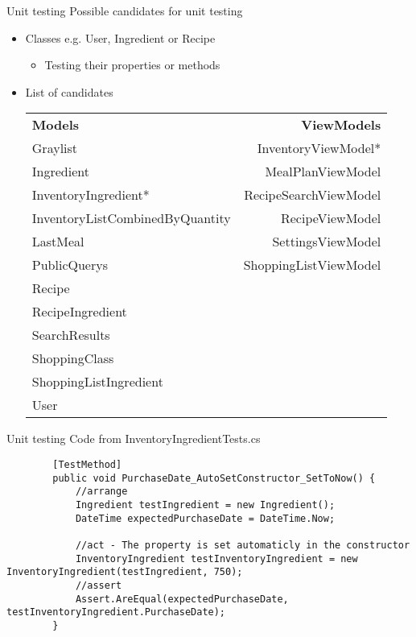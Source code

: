 \begin{frame}[fragile] {Unit testing} {Possible candidates for unit testing}

	\begin{itemize}
		\item Classes e.g. User, Ingredient or Recipe
			\begin{itemize}
				\item Testing their properties or methods
			\end{itemize}
		\item List of candidates	 	
				{\small
				\begin{tabular} {l r}
							\textbf{Models} & \textbf{ViewModels} \\
							Graylist & InventoryViewModel* \\
							Ingredient & MealPlanViewModel \\
							InventoryIngredient* & RecipeSearchViewModel \\
							InventoryListCombinedByQuantity & RecipeViewModel \\
							LastMeal & SettingsViewModel \\
							PublicQuerys & ShoppingListViewModel \\
							Recipe \\
							RecipeIngredient \\
							SearchResults \\
							ShoppingClass \\
							ShoppingListIngredient \\
							User
				\end{tabular}
				}					
	\end{itemize}
		
\end{frame}

\begin{frame}[fragile] {Unit testing} {Code from InventoryIngredientTests.cs}
	{\small	
	\begin{lstlisting}
		[TestMethod]
		public void PurchaseDate_AutoSetConstructor_SetToNow() {
			//arrange
			Ingredient testIngredient = new Ingredient();
			DateTime expectedPurchaseDate = DateTime.Now;
			
			//act - The property is set automaticly in the constructor
			InventoryIngredient testInventoryIngredient = new InventoryIngredient(testIngredient, 750);
			//assert
			Assert.AreEqual(expectedPurchaseDate, testInventoryIngredient.PurchaseDate); 
		}
	\end{lstlisting}
	}
\end{frame}